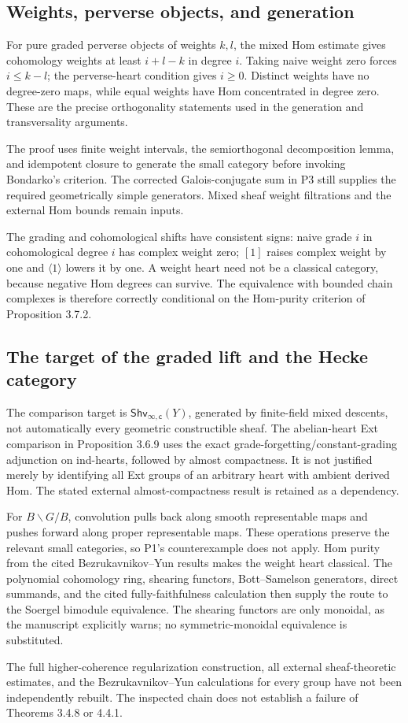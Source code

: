 \documentclass[10pt]{article}
\begin{document}
\subsection*{Weights, perverse objects, and generation}
For pure graded perverse objects of weights \(k,l\), the mixed Hom estimate gives cohomology weights at least \(i+l-k\) in degree \(i\). Taking naive weight zero forces \(i\leq k-l\); the perverse-heart condition gives \(i\geq0\). Distinct weights have no degree-zero maps, while equal weights have Hom concentrated in degree zero. These are the precise orthogonality statements used in the generation and transversality arguments.\par
The proof uses finite weight intervals, the semiorthogonal decomposition lemma, and idempotent closure to generate the small category before invoking Bondarko’s criterion. The corrected Galois-conjugate sum in P3 still supplies the required geometrically simple generators. Mixed sheaf weight filtrations and the external Hom bounds remain inputs.\par
The grading and cohomological shifts have consistent signs: naive grade \(i\) in cohomological degree \(i\) has complex weight zero; \([1]\) raises complex weight by one and \(\langle1\rangle\) lowers it by one. A weight heart need not be a classical category, because negative Hom degrees can survive. The equivalence with bounded chain complexes is therefore correctly conditional on the Hom-purity criterion of Proposition 3.7.2.\par
\subsection*{The target of the graded lift and the Hecke category}
The comparison target is \(\mathsf{Shv}_{\infty,\mathsf c}(Y)\), generated by finite-field mixed descents, not automatically every geometric constructible sheaf. The abelian-heart Ext comparison in Proposition 3.6.9 uses the exact grade-forgetting/constant-grading adjunction on ind-hearts, followed by almost compactness. It is not justified merely by identifying all Ext groups of an arbitrary heart with ambient derived Hom. The stated external almost-compactness result is retained as a dependency.\par
For \(B\backslash G/B\), convolution pulls back along smooth representable maps and pushes forward along proper representable maps. These operations preserve the relevant small categories, so P1’s counterexample does not apply. Hom purity from the cited Bezrukavnikov–Yun results makes the weight heart classical. The polynomial cohomology ring, shearing functors, Bott–Samelson generators, direct summands, and the cited fully-faithfulness calculation then supply the route to the Soergel bimodule equivalence. The shearing functors are only monoidal, as the manuscript explicitly warns; no symmetric-monoidal equivalence is substituted.\par
The full higher-coherence regularization construction, all external sheaf-theoretic estimates, and the Bezrukavnikov–Yun calculations for every group have not been independently rebuilt. The inspected chain does not establish a failure of Theorems 3.4.8 or 4.4.1.\par
\end{document}
